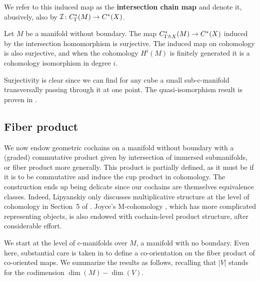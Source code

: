 We refer to this induced map as the \textbf{intersection chain map} and denote it, abusively, also by $\mathcal{I} \colon C_\Gamma^*(M)\to C^*(X)$.

\begin{theorem}\label{T:stokes}
	Let $M$ be a manifold without boundary.
	The map $C^*_{\Gamma \pitchfork X}(M) \to C^{\ast}(X)$ induced by the intersection homomorphism is  surjective.
	The induced map on cohomology is also surjective, and when the cohomology $H^i(M)$ is finitely generated it is a cohomology isomorphism in degree $i$.
\end{theorem}

Surjectivity is clear since we can find for any cube a small sub-c-manifold transversally passing through it at one point.
The quasi-isomorphism result is proven in \cite[Theorem 6.21]{medina2022foundations}.

\subsection{Fiber product}\label{S:fiber product section}

We now endow geometric cochains on a manifold without boundary with a (graded) commutative product given by intersection of immersed submanifolds, or fiber product more generally.
This product is partially defined, as it must be if it is to be commutative and induce the cup product in cohomology.
The construction ends up being delicate since our cochains are themselves equivalence classes.
Indeed, Lipyanskiy only discusses multiplicative structure at the level of cohomology in Section~5 of \cite{Lipy14}.
Joyce's M-cohomology \cite{Joyc15}, which has more complicated representing objects, is also endowed with cochain-level product structure, after considerable effort.

We start at the level of c-manifolds over $M$, a manifold with no boundary.
Even here, substantial care is taken in \cite[Section 3.5.2]{medina2022foundations} to define a co-orientation on the fiber product of co-oriented maps.
We summarize the results as follows, recalling that $|V|$ stands for the codimension $\dim(M)-\dim(V)$.

